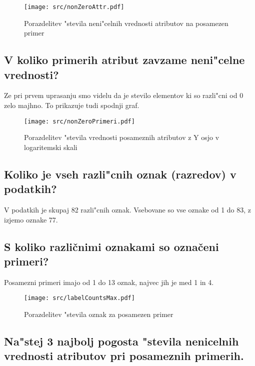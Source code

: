 \documentclass[a4paper,11pt]{article}
\begin{document}
\begin{figure}[H]
\begin{center}
\texttt{[image: src/nonZeroAttr.pdf]}
\caption{Porazdelitev "stevila neni"celnih vrednosti atributov na posamezen primer}
\label{slika1}
\end{center}
\end{figure}

\subsection{V koliko primerih atribut zavzame neni"celne vrednosti?}
Ze pri prvem uprasanju smo videlu da je stevilo elementov ki so razli"cni od 0 zelo majhno. To prikazuje tudi spodnji graf.

\begin{figure}[H]
\begin{center}
\texttt{[image: src/nonZeroPrimeri.pdf]}
\caption{Porazdelitev "stevila vrednosti posameznih atributov z Y osjo v logaritemski skali}
\label{slika2}
\end{center}
\end{figure}

\subsection{Koliko je vseh razli"cnih oznak (razredov) v podatkih?}

V podatkih je skupaj 82 razli"cnih oznak. Vsebovane so vse oznake od 1 do 83, z izjemo oznake 77.

\subsection{S koliko različnimi oznakami so označeni primeri?}

Posamezni primeri imajo od 1 do 13 oznak, najvec jih je med 1 in 4. 

\begin{figure}[H]
\begin{center}
\texttt{[image: src/labelCountsMax.pdf]}
\caption{Porazdelitev "stevila oznak za posamezen primer}
\label{slika2}
\end{center}
\end{figure}

\subsection{Na"stej 3 najbolj pogosta "stevila nenicelnih vrednosti atributov pri posameznih primerih.}
\end{document}
